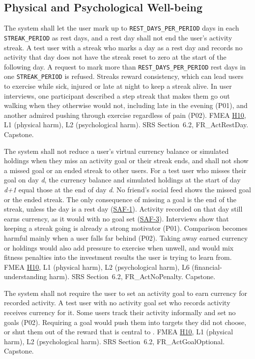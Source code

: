 \documentclass{article}
\newcommand{\reqref}[1]{\hyperref[req:#1]{#1}}
\newcommand{\hazref}[1]{\hyperref[#1]{#1}}
\begin{document}
\subsection{Physical and Psychological Well-being}

\begin{description}

{The system shall let the user mark up to \texttt{REST\_DAYS\_PER\_PERIOD}
days in each \texttt{STREAK\_PERIOD} as rest days, and a rest day shall not end
the user's activity streak.}
{A test user with a streak who marks a day as a rest day and records no
activity that day does not have the streak reset to zero at the start of the
following day. A request to mark more than \texttt{REST\_DAYS\_PER\_PERIOD}
rest days in one \texttt{STREAK\_PERIOD} is refused.}
{Streaks reward consistency, which can lead users to exercise while sick,
injured or late at night to keep a streak alive. In user interviews, one
participant described a step streak that makes them go out walking when they
otherwise would not, including late in the evening (P01), and another admired
pushing through exercise regardless of pain (P02).}
{FMEA \hazref{H10}, L1 (physical harm), L2 (psychological harm).}
{SRS Section~6.2, FR\_ActRestDay.}
{Capstone.}

{The system shall not reduce a user's virtual currency balance or simulated
holdings when they miss an activity goal or their streak ends, and shall not
show a missed goal or an ended streak to other users.}
{For a test user who misses their goal on day \textit{d}, the currency balance
and simulated holdings at the start of day \textit{d+1} equal those at the end
of day \textit{d}. No friend's social feed shows the missed goal or the ended
streak.}
{The only consequence of missing a goal is the end of the streak, unless the
day is a rest day (\reqref{SAF-1}). Activity recorded on that day still earns
currency, as it would with no goal set (\reqref{SAF-3}). Interviews show that
keeping a streak going is already a strong motivator (P01). Comparison becomes
harmful mainly when a user falls far behind (P02). Taking away earned currency
or holdings would also add pressure to exercise when unwell, and would mix
fitness penalties into the investment results the user is trying to learn
from.}
{FMEA \hazref{H10}, L1 (physical harm), L2 (psychological harm), L6 (financial-understanding harm).}
{SRS Section~6.2, FR\_ActNoPenalty.}
{Capstone.}

{The system shall not require the user to set an activity goal to earn
currency for recorded activity.}
{A test user with no activity goal set who records activity receives currency
for it.}
{Some users track their activity informally and set no goals (P02). Requiring a
goal would push them into targets they did not choose, or shut them out of the
reward that is central to \progname{}.}
{FMEA \hazref{H10}, L1 (physical harm), L2 (psychological harm).}
{SRS Section~6.2, FR\_ActGoalOptional.}
{Capstone.}


\end{description}
\end{document}
